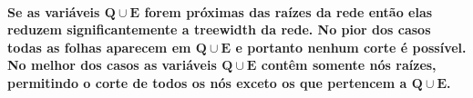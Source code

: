 \documentclass[a4paper,10pt]{article}
\theoremstyle{plain}
\begin{document}
\paragraph{
  Se as variáveis $\mathbf{Q} \cup \mathbf{E}$ forem próximas das raízes da rede então elas reduzem 
  significantemente a treewidth da rede. No pior dos casos todas as folhas aparecem em $\mathbf{Q}
  \cup \mathbf{E}$ e portanto nenhum corte é possível. No melhor dos casos as variáveis $\mathbf{Q}
  \cup \mathbf{E}$ contêm somente nós raízes, permitindo o corte de todos os nós exceto os que
  pertencem a $\mathbf{Q} \cup \mathbf{E}$.
}

\newpage

\printbibliography
\end{document}
